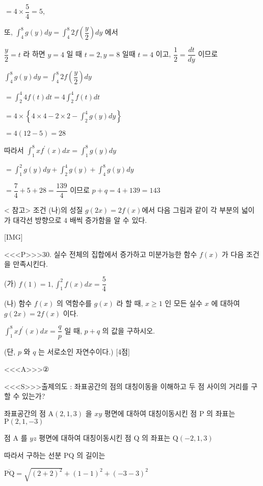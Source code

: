 \documentclass{oblivoir}
\begin{document}
$=4 \times \dfrac{5}{4}=5$,

또, $\displaystyle\int_{4}^{8} g(y) d y=\displaystyle\int_{4}^{8} 2 f\left(\dfrac{y}{2}\right) d y$ 에서

$\dfrac{y}{2}=t$ 라 하면 $y=4$ 일 때 $t=2, y=8$ 일때 $t=4$ 이고, $\dfrac{1}{2}=\dfrac{d t}{d y}$ 이므로

$\displaystyle\int_{4}^{8} g(y) d y=\displaystyle\int_{4}^{8} 2 f\left(\dfrac{y}{2}\right) d y$

$=\displaystyle\int_{2}^{4} 4 f(t) d t=4 \displaystyle\int_{2}^{4} f(t) d t$

$=4 \times\left\{4 \times 4-2 \times 2-\displaystyle\int_{2}^{4} g(y) d y\right\}$

$=4(12-5)=28$

따라서
$\displaystyle\int_{1}^{8} x f^{\prime}(x) d x=\displaystyle\int_{1}^{8} g(y) d y$

$=\displaystyle\int_{1}^{2} g(y) d y+\displaystyle\int_{2}^{4} g(y)+\displaystyle\int_{4}^{8} g(y) d y$

$=\dfrac{7}{4}+5+28=\dfrac{139}{4}$
이므로
$p+q=4+139=143$

<  참고>
조건 (나)의 성질 $g(2 x)=2 f(x)$에서 다음 그림과 같이 각 부분의 넓이가 대각선 방향으로 $4$ 배씩 증가함을 알 수 있다.

[IMG]


<<<P>>>30. 실수 전체의 집합에서 증가하고 미분가능한 함수 $f(x)$ 가 다음 조건을 만족시킨다.

(가) $f(1)=1, \displaystyle\int_{1}^{2} f(x) d x=\dfrac{5}{4}$

(나) 함수 $f(x)$ 의 역함수를 $g(x)$ 라 할 때, $x \geq 1$ 인 모든 실수 $x$ 에 대하여 $g(2 x)=2 f(x)$ 이다.

$\displaystyle\int_{1}^{8} x f^{\prime}(x) d x=\dfrac{q}{p}$ 일 때, $p+q$ 의 값을 구하시오.

(단, $p$ 와 $q$ 는 서로소인 자연수이다.) [4점]

<<<A>>>②

<<<S>>>출제의도 : 좌표공간의 점의 대칭이동을 이해하고 두 점 사이의 거리를 구할 수 있는가?

좌표공간의 점 $\mathrm{A}(2,1,3)$ 을 $x y$ 평면에 대하여 대칭이동시킨 점 $\mathrm{P}$ 의 좌표는
$\mathrm{P}(2,1,-3)$

점 $\mathrm{A}$ 를 $y z$ 평면에 대하여 대칭이동시킨 점 $\mathrm{Q}$ 의 좌표는
$\mathrm{Q}(-2,1,3)$

따라서 구하는 선분 $\mathrm{PQ}$ 의 길이는

$\overline{\mathrm{PQ}}=\sqrt{(2+2)^{2}}+(1-1)^{2}+(-3-3)^{2}$
\end{document}
